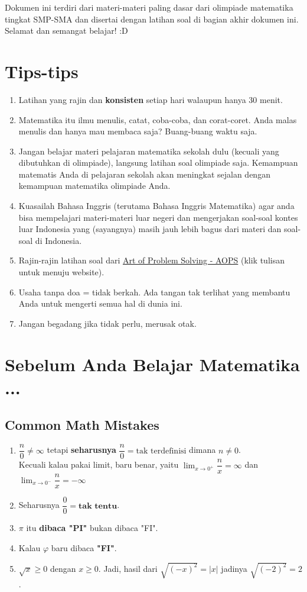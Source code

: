 \graphicspath{{./}}

Dokumen ini terdiri dari materi-materi paling dasar dari olimpiade matematika tingkat SMP-SMA dan disertai dengan latihan soal di bagian akhir dokumen ini. Selamat dan semangat belajar! :D
	\section{Tips-tips}
	\begin{enumerate}
	    \item Latihan yang rajin dan \textbf{konsisten} setiap hari walaupun hanya 30 menit.
	    \item Matematika itu ilmu menulis, catat, coba-coba, dan corat-coret. Anda malas menulis dan hanya mau membaca saja? Buang-buang waktu saja.
	    \item Jangan belajar materi pelajaran matematika sekolah dulu (kecuali yang dibutuhkan di olimpiade), langsung latihan soal olimpiade saja. Kemampuan matematis Anda di pelajaran sekolah akan meningkat sejalan dengan kemampuan matematika olimpiade Anda.
	    \item Kuasailah Bahasa Inggris (terutama Bahasa Inggris Matematika) agar anda bisa mempelajari materi-materi luar negeri dan mengerjakan soal-soal kontes luar Indonesia yang (sayangnya) masih jauh lebih bagus dari materi dan soal-soal di Indonesia.
	    \item Rajin-rajin latihan soal dari \href{https://artofproblemsolving.com/community}{Art of Problem Solving - AOPS} (klik tulisan untuk menuju website).
	    \item Usaha tanpa doa = tidak berkah. Ada tangan tak terlihat yang membantu Anda untuk mengerti semua hal di dunia ini.
	    \item Jangan begadang jika tidak perlu, merusak otak.

	\end{enumerate}
	
	\section{Sebelum Anda Belajar Matematika ...}
	\subsection{Common Math Mistakes}
	\begin{enumerate}
	    \item $\dfrac{n}{0} \neq \infty$ tetapi \textbf{seharusnya} $\dfrac{n}{0} = \text{tak terdefinisi}$ dimana $n \neq 0$.\\
	    Kecuali kalau pakai limit, baru benar, yaitu $\lim_{x \rightarrow 0^+} \dfrac{n}{x} = \infty$ dan $\lim_{x \rightarrow 0^-} \dfrac{n}{x} = -\infty$
	    \item Seharusnya $\dfrac{0}{0} = \textbf{tak tentu}$.
	    \item $\pi$ itu \textbf{dibaca "PI"} bukan dibaca "FI". 
	    \item Kalau $\varphi$ baru dibaca \textbf{"FI"}.
	    \item $\sqrt{x} \ge 0$ dengan $x \ge 0$. Jadi, hasil dari $\sqrt{(-x)^2}=|x|$ jadinya $\sqrt{(-2)^2}=2$.
	\end{enumerate}
